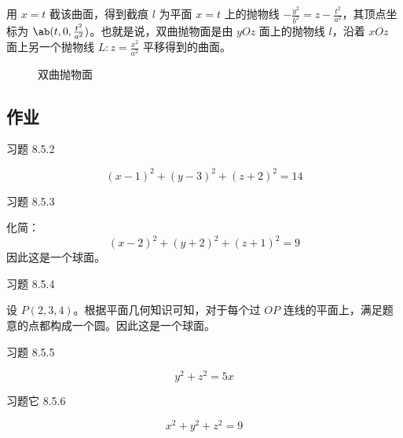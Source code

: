 用 $x = t$ 截该曲面，得到截痕 $l$ 为平面 $x = t$ 上的抛物线 $-\frac{y^2}{b^2} = z - \frac{t^2}{a^2}$，其顶点坐标为 $\ab(t, 0, \frac{t^2}{a^2})$。也就是说，双曲抛物面是由 $yOz$ 面上的抛物线 $l$，沿着 $xOz$ 面上另一个抛物线 $L: z = \frac{x^2}{a^2}$ 平移得到的曲面。

\begin{figure}[H]
	\centering
	\caption{双曲抛物面}
\end{figure}

\subsection{作业}

\begin{problem}
	习题 8.5.2
	\begin{solution}
		$$
		(x - 1)^2 + (y - 3)^2 + (z + 2)^2 = 14
		$$
	\end{solution}
\end{problem}

\begin{problem}
	习题 8.5.3
	\begin{solution}
		化简：
		$$
		(x - 2)^2 + (y + 2)^2 + (z + 1)^2 = 9
		$$
		因此这是一个球面。
	\end{solution}
\end{problem}

\begin{problem}
	习题 8.5.4
	\begin{solution}
		设 $P(2, 3, 4)$。根据平面几何知识可知，对于每个过 $OP$ 连线的平面上，满足题意的点都构成一个圆。因此这是一个球面。
	\end{solution}
\end{problem}

\begin{problem}
	习题 8.5.5
	\begin{solution}
		$$
		y^2 + z^2 = 5x
		$$
	\end{solution}
\end{problem}

\begin{problem}
	习题它 8.5.6
	\begin{solution}
		$$
		x^2 + y^2 + z^2 = 9
		$$
	\end{solution}
\end{problem}

